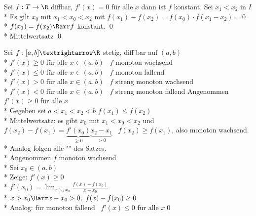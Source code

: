 Sei $f: T \to \R$ diffbar, $f'(x) = 0$ für alle $x$ dann ist $f$ konstant.
\bew
Sei $x_1 < x_2$ in $I$\\*
Es gilt $x_0$ mit $x_1 < x_0 < x_2$ mit $f(x_1) - f(x_2) = f(x_0) \cdot f(x_1 - x_2) = 0$\\*
\Rarr{} $f(x_1) = f(x_2) \Rarr f$ konstant. \qed{}\\*
Mittelwertsatz \qed

Sei $f:[a,b]→\R$ stetig, diff'bar auf $(a,b)$\\*
$f'(x)\geq 0$ für alle $x\in (a,b)$ \equ\ $f$ monoton wachsend\\*
$f'(x)\leq 0$ für alle $x\in (a,b)$ \equ\ $f$ monoton fallend\\*
$f'(x)> 0$ für alle $x\in (a,b)$ \Rarr\ $f$ streng monoton wachsend\\*
$f'(x)< 0$ für alle $x\in (a,b)$ \Rarr\ $f$ streng monoton fallend
\bew
Angenommen $f'(x)\geq 0$ für alle $x$\\*
Gegeben sei $a<x_1<x_2<b$
$f(x_1)\leq f(x_2)$\\*
Mittelwertsatz: es gibt $x_0$ mit $x_1<x_0<x_2$ und $f(x_2)-f(x_1)=\underbrace{f'(x_0)}_{\geq 0}\underbrace{x_2-x_1}_{>0}$ \Rarr\ $f(x_2)\geq f(x_1)$, also monoton wachsend.\\*
Analog folgen alle "\Rarr" des Satzes.\\*
Angenommen $f$ monoton wachsend\\*
Sei $x_0 \in (a, b)$\\*
Zeige: $f'(x) \geq 0$\\*
$f'(x_0) = \lim_{x \searrow x_0}\frac{f(x) - f(x_0)}{x - x_0}$\\*
$x > x_0 \Rarr x - x_0 > 0,\ f(x) - f(x_0) \geq 0$\\*
Analog: für monoton fallend \Rarr\ $f'(x)\leq 0$ für alle $x$\qed
\bsp
